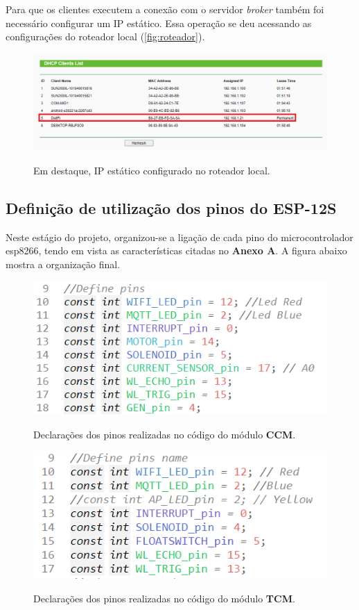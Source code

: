 Para que os clientes executem a conexão com o servidor \textit{broker} também foi necessário configurar um IP estático. Essa operação se deu acessando as configurações do roteador local (\autoref{fig:roteador}).

\begin{figure}[H]
	\centering
	\caption{Em destaque, IP estático configurado no roteador local.}
	\includegraphics[width=1
	\textwidth]{figuras/ip_estatico_rasp.png}
	\label{fig:roteador}
\end{figure}


\subsection {Definição de utilização dos pinos do ESP-12S}

Neste estágio do projeto, organizou-se a ligação de cada pino do microcontrolador esp8266, tendo em vista as características citadas no \textbf{Anexo A}. A figura abaixo mostra a organização final.

\begin{figure}[H]
	\centering
	\caption{Declarações dos pinos realizadas no código do módulo \textbf{CCM}.}
	\includegraphics[width=0.5
	\textwidth]{figuras/pinos_definicao_ccm2.png}
	\label{fig:definicao_pinos_ccm}
\end{figure}

\begin{figure}[H]
	\centering
	\caption{Declarações dos pinos realizadas no código do módulo \textbf{TCM}.}
	\includegraphics[width=0.5
	\textwidth]{figuras/pinos_definicao_tcm.png}
	\label{fig:definicao_pinos_tcm}
\end{figure}


